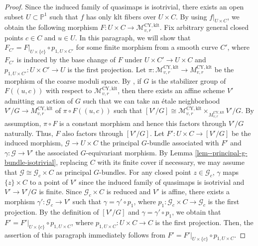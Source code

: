 \documentclass[12pt,twoside]{amsart}
\theoremstyle{definition}
\begin{document}
\begin{proof}
Since the induced family of quasimaps is isotrivial, there exists an open subset $U \subset \mathbb{P}^{1}$ 
 such that $f$ has only klt fibers over $U\times C$. 
By using $f|_{U\times C}$, we obtain the following morphism $F\colon U\times C\to \mathcal{M}^{\mathrm{CY,klt}}_{v,r}$.
Fix arbitrary general closed points $c\in C$ and $u\in U$.
In this paragraph, we will show that $F_{C'}=F|_{U\times \{c\}}\circ p_{1,U\times C'}$ for some finite morphism from a smooth curve $C'$, where $F_{C'}$ is induced by the base change of $F$ under $U\times C'\to U\times C$ and $p_{1,U\times C'}\colon U\times C'\to U$ is the first projection.
Let $\pi\colon \mathcal{M}^{\mathrm{CY,klt}}_{v,r}\to M^{\mathrm{CY,klt}}_{v,r}$ be the morphism of the coarse moduli space.
By \cite[Theorem 11.3.1]{Ols}, if $G$ is the stabilizer group of $F((u,c))$ with respect to $\mathcal{M}^{\mathrm{CY,klt}}_{v,r}$, then there exists an affine scheme $V'$ admitting an action of $G$ such that we can take an \'etale neighborhood $V'/G\to M^{\mathrm{CY,klt}}_{v,r}$ of $\pi\circ F((u,c))$ such that $[V'/G]\cong\mathcal{M}^{\mathrm{CY,klt}}_{v,r}\times_{M^{\mathrm{CY,klt}}_{v,r}}V'/G$. 
By assumption, $\pi\circ F$ is a constant morphism and hence this factors through $V'/G$ naturally.
Thus, $F$ also factors through $[V'/G]$.
Let $F'\colon U\times C\to [V'/G]$ be the induced morphism, $\mathscr{G}\to U\times C$ the principal $G$-bundle associated with $F'$ and $\gamma\colon \mathscr{G}\to V'$ the associated $G$-equivariant morphism.
By Lemma \ref{lem--principal-g-bundle-isotrivial}, replacing $C$ with its finite cover if necessary, we may assume that $\mathscr{G}\cong\mathscr{G}_c\times C$ as principal $G$-bundles.
For any closed point $z\in \mathscr{G}_c$, $\gamma$ maps $\{z\}\times C$ to a point of $V'$ since the induced family of quasimaps is isotrivial and $V'\to V'/G$ is finite.
Since $\mathscr{G}_c\times C$ is reduced and $V'$ is affine, there exists a morphism $\gamma'\colon \mathscr{G}_c\to V'$ such that $\gamma=\gamma'\circ p_1$, where $p_1\colon \mathscr{G}_c\times C\to \mathscr{G}_c$ is the first projection.
By the definition of $[V'/G]$ and $\gamma=\gamma'\circ p_1$, we obtain that $F'=F'|_{U\times\{c\}}\circ p_{1,U\times C}$, where $p_{1,U\times C}\colon U\times C\to C$ is the first projection. 
Then, the assertion of this paragraph immediately follows from $F'=F'|_{U\times\{c\}}\circ p_{1,U\times C}$.


\end{proof}
\end{document}
